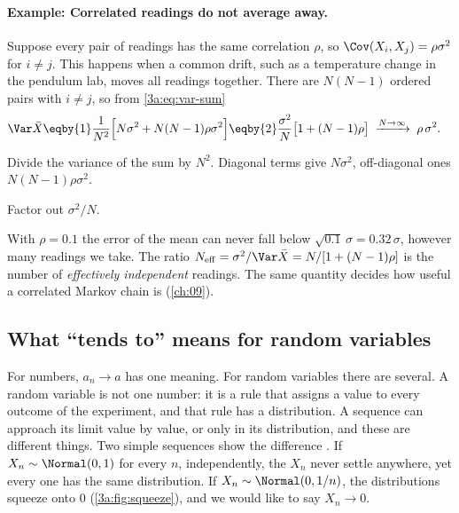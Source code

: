 \paragraph{Example: Correlated readings do not average away.}
\label{3a:ex:correlated-mean}
Suppose every pair of readings has the same correlation $\rho$, so
$\Cov(X_i,X_j)=\rho\sigma^2$ for $i\neq j$. This happens when a common
drift, such as a temperature change in the pendulum lab, moves all readings
together. There are $N(N-1)$ ordered pairs with $i\neq j$, so from
\eqref{3a:eq:var-sum}
\begin{align*}
  \Var\bar X
  &\eqby{1} \frac1{N^2}\Bigl[N\sigma^2+N(N-1)\rho\sigma^2\Bigr]
   \eqby{2} \frac{\sigma^2}{N}\bigl[1+(N-1)\rho\bigr]
   \;\xrightarrow{N\to\infty}\;\rho\,\sigma^2 .
\end{align*}
\begin{explain}
  \item Divide the variance of the sum by $N^2$. Diagonal terms give $N\sigma^2$, off-diagonal ones $N(N-1)\rho\sigma^2$.
  \item Factor out $\sigma^2/N$.
\end{explain}
With $\rho=0.1$ the error of the mean can never fall below
$\sqrt{0.1}\,\sigma=0.32\,\sigma$, however many readings we take. The ratio
$N_{\mathrm{eff}}=\sigma^2/\Var\bar X=N/[1+(N-1)\rho]$ is the number of
\emph{effectively independent} readings. The same quantity decides how
useful a correlated Markov chain is (\cref{ch:09}).

\subsection{What ``tends to'' means for random variables}
\label{3a:sec:convergence}

For numbers, $a_n\to a$ has one meaning. For random variables there are
several. A random variable is not one number: it is a rule that assigns a
value to every outcome of the experiment, and that rule has a distribution.
A sequence can approach its limit value by value, or only in its
distribution, and these are different things. Two simple sequences show the
difference . If $X_n\sim\Normal(0,1)$ for every $n$, independently, the
$X_n$ never settle anywhere, yet every one has the same distribution. If
$X_n\sim\Normal(0,1/n)$, the distributions squeeze onto $0$
(\cref{3a:fig:squeeze}), and we would like to say $X_n\to0$.

